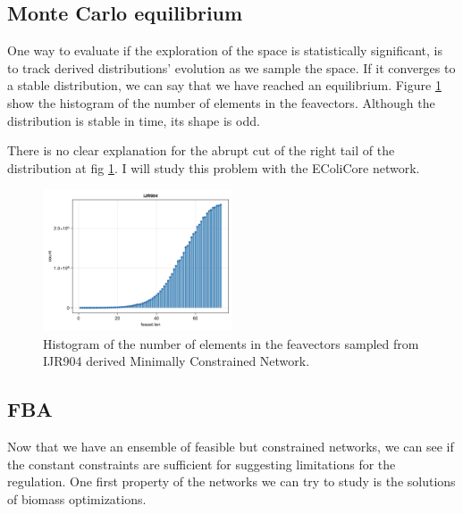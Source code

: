 \documentclass[11pt, letterpaper]{article}
\begin{document}
\subsection{Monte Carlo equilibrium}


One way to evaluate if the exploration of the space is statistically significant, is to track derived distributions' evolution as we sample the space.
If it converges to a stable distribution, we can say that we have reached an equilibrium.
Figure \ref{fig:feaset.len.hist} show the histogram of the number of elements in the feavectors.
Although the distribution is stable in time, its shape is odd.


\begin{issue-box}[]
   \label{issue:feaset.len.hist}
   There is no clear explanation for the abrupt cut of the right tail of the distribution at fig \ref{fig:feaset.len.hist}.
   I will study this problem with the EColiCore network.
\end{issue-box}




\begin{figure}[h!]
   \centering
   \includegraphics[width=0.5\textwidth]{images/feaset_len_hist.png}
   \caption{
       Histogram of the number of elements in the feavectors sampled from IJR904 derived Minimally Constrained Network.
   }   
   \label{fig:feaset.len.hist}
\end{figure}




\subsection{FBA}


Now that we have an ensemble of feasible but constrained networks, we can see if the constant constraints are sufficient for suggesting limitations for the regulation.
One first property of the networks we can try to study is the solutions of biomass optimizations.
\end{document}
